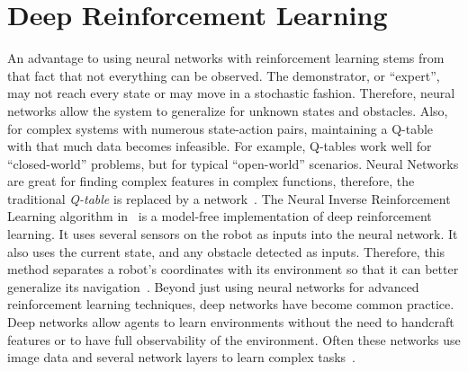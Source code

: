 \documentclass[12pt,american]{report}
\begin{document}
\section{Deep Reinforcement Learning}
An advantage to using neural networks with reinforcement learning stems from that fact that not everything can be observed. The demonstrator, or ``expert'', may not reach every state or may move in a stochastic fashion. Therefore, neural networks allow the system to generalize for unknown states and obstacles. Also, for complex systems with numerous state-action pairs, maintaining a Q-table with that much data becomes infeasible. For example, Q-tables work well for ``closed-world'' problems, but for typical ``open-world'' scenarios. Neural Networks are great for finding complex features in complex functions, therefore, the traditional \textit{Q-table} is replaced by a network~\cite{matiisen_2015}. The Neural Inverse Reinforcement Learning algorithm in~\cite{xia2016neural} is a model-free implementation of deep reinforcement learning. It uses several sensors on the robot as inputs into the neural network.  It also uses the current state, and any obstacle detected as inputs. Therefore, this method separates a robot's coordinates with its environment so that it can better generalize its navigation~\cite{xia2016neural}. Beyond just using neural networks for advanced reinforcement learning techniques, deep networks have become common practice. Deep networks allow agents to learn environments without the need to handcraft features or to have full observability of the environment. Often these networks use image data and several network layers to learn complex tasks~\cite{atari}.
	
\end{document}
